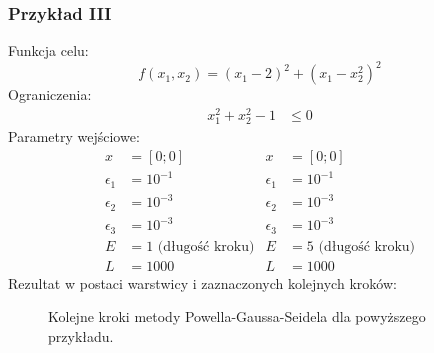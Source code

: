 \documentclass[a4paper,12pt]{article}
\begin{document}
\subsubsection{Przykład III}
Funkcja celu:
\begin{equation}
    f(x_{1}, x_{2}) = (x_{1} - 2)^{2} + (x_{1} - x_{2}^{2})^{2}
\end{equation}
Ograniczenia:
\begin{equation}
    \begin{split}
        x_{1}^{2} + x_{2}^{2} - 1 &\leq 0
    \end{split}
\end{equation}
Parametry wejściowe:
\begin{align*}
    x &= [0; 0] & x &= [0; 0]\\
    \epsilon_{1} &= 10^{-1} & \epsilon_{1} &= 10^{-1} \\
    \epsilon_{2} &= 10^{-3} & \epsilon_{2} &= 10^{-3} \\
    \epsilon_{3} &= 10^{-3} & \epsilon_{3} &= 10^{-3} \\
    E &= 1 \mbox{ (długość kroku)} & E &= 5 \mbox{ (długość kroku)}\\
    L &= 1000 & L &= 1000
\end{align*}
\newpage
Rezultat w postaci warstwicy i zaznaczonych kolejnych kroków:
\begin{figure}[H]
    \centering
    \quad
    \caption{Kolejne kroki metody Powella-Gaussa-Seidela dla powyższego przykładu.}
\end{figure}
\end{document}
